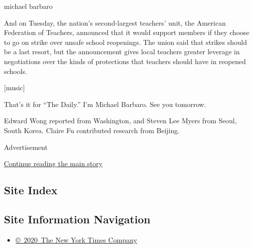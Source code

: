 michael barbaro

And on Tuesday, the nation's second-largest teachers' unit, the American
Federation of Teachers, announced that it would support members if they
choose to go on strike over unsafe school reopenings. The union said
that strikes should be a last resort, but the announcement gives local
teachers greater leverage in negotiations over the kinds of protections
that teachers should have in reopened schools.

{[}music{]}

That's it for ``The Daily.'' I'm Michael Barbaro. See you tomorrow.

Edward Wong reported from Washington, and Steven Lee Myers from Seoul,
South Korea. Claire Fu contributed research from Beijing.

Advertisement

\protect\hyperlink{after-bottom}{Continue reading the main story}

\hypertarget{site-index}{%
\subsection{Site Index}\label{site-index}}

\hypertarget{site-information-navigation}{%
\subsection{Site Information
Navigation}\label{site-information-navigation}}

\begin{itemize}
\tightlist
\item
  \href{https://help.nytimes3xbfgragh.onion/hc/en-us/articles/115014792127-Copyright-notice}{©~2020~The
  New York Times Company}
\end{itemize}


